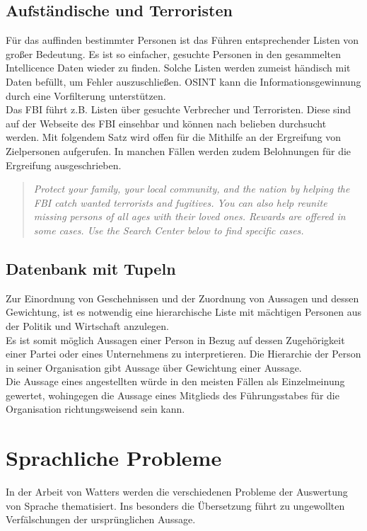 \documentclass[twoside,a4paper]{article}
\begin{document}
\subsection{Aufständische und Terroristen}
Für das auffinden bestimmter Personen ist das Führen entsprechender Listen von großer Bedeutung. Es ist so einfacher, gesuchte Personen in den gesammelten Intellicence Daten wieder zu finden. Solche Listen werden zumeist händisch mit Daten befüllt, um Fehler auszuschließen. OSINT kann die Informationsgewinnung durch eine Vorfilterung unterstützen.\\
Das FBI führt z.B. Listen über gesuchte Verbrecher und Terroristen. Diese sind auf der Webseite\cite{wanted} des FBI einsehbar und können nach belieben durchsucht werden. Mit folgendem Satz wird offen für die Mithilfe an der Ergreifung von Zielpersonen aufgerufen. In manchen Fällen werden zudem Belohnungen für die Ergreifung ausgeschrieben.

\begin{quote}
\textit{Protect your family, your local community, and the nation by helping the FBI catch wanted terrorists and fugitives. You can also help reunite missing persons of all ages with their loved ones. Rewards are offered in some cases. Use the Search Center below to find specific cases.}
\end{quote}


\subsection{Datenbank mit Tupeln}
Zur Einordnung von Geschehnissen und der Zuordnung von Aussagen und dessen Gewichtung, ist es notwendig eine hierarchische Liste mit mächtigen Personen aus der Politik und Wirtschaft anzulegen.\\
Es ist somit möglich Aussagen einer Person in Bezug auf dessen Zugehörigkeit einer Partei oder eines Unternehmens zu interpretieren. Die Hierarchie der Person in seiner Organisation gibt Aussage über Gewichtung einer Aussage.\\
Die Aussage eines angestellten würde in den meisten Fällen als Einzelmeinung gewertet, wohingegen die Aussage eines Mitglieds des Führungsstabes für die Organisation richtungsweisend sein kann.


\section{Sprachliche Probleme}
In der Arbeit von Watters\cite{challenges_to_automated_alloegory} werden die verschiedenen Probleme der Auswertung von Sprache thematisiert. Ins besonders die Übersetzung führt zu ungewollten Verfälschungen der ursprünglichen Aussage.
\end{document}
